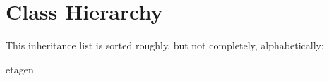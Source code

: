 \section{Class Hierarchy}
This inheritance list is sorted roughly, but not completely, alphabetically\-:\begin{DoxyCompactList}
\item {}
\item etagen\begin{DoxyCompactList}
\item {}
\end{DoxyCompactList}
\end{DoxyCompactList}
